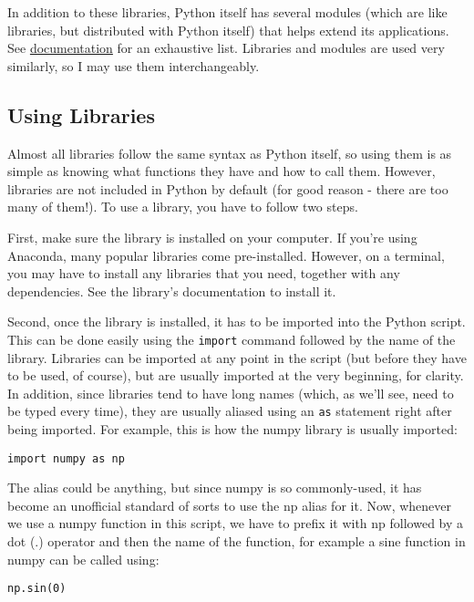 \documentclass[12pt]{article}
\newcommand{\code}{\texttt}
\begin{document}
In addition to these libraries, Python itself has several modules (which are like libraries, but distributed with Python itself) that helps extend its applications. See \href{https://docs.python.org/3/py-modindex.html}{documentation} for an exhaustive list. Libraries and modules are used very similarly, so I may use them interchangeably.

\subsection{Using Libraries}
Almost all libraries follow the same syntax as Python itself, so using them is as simple as knowing what functions they have and how to call them. However, libraries are not included in Python by default (for good reason - there are too many of them!). To use a library, you have to follow two steps. 

First, make sure the library is installed on your computer. If you're using Anaconda, many popular libraries come pre-installed. However, on a terminal, you may have to install any libraries that you need, together with any dependencies. See the library's documentation to install it.

Second, once the library is installed, it has to be imported into the Python script. This can be done easily using the \code{import} command followed by the name of the library. Libraries can be imported at any point in the script (but before they have to be used, of course), but are usually imported at the very beginning, for clarity. In addition, since libraries tend to have long names (which, as we'll see, need to be typed every time), they are usually aliased using an \code{as} statement right after being imported. For example, this is how the numpy library is usually imported:

\begin{lstlisting}[frame=single] 
import numpy as np
\end{lstlisting}

The alias could be anything, but since numpy is so commonly-used, it has become an unofficial standard of sorts to use the np alias for it. Now, whenever we use a numpy function in this script, we have to prefix it with np followed by a dot (.) operator and then the name of the function, for example a sine function in numpy can be called using:

\begin{lstlisting}[frame=single] 
np.sin(0)
\end{lstlisting}
\end{document}
